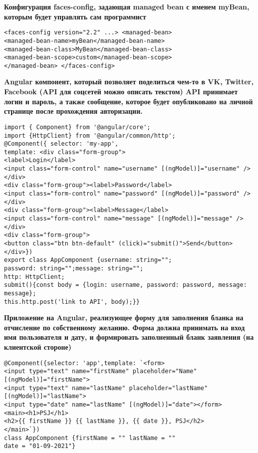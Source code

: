 \documentclass{article}
\begin{document}
\begin{minipage}[t]{0.3\textwidth}
    \textbf{Конфигурация faces-config, задающая managed bean с именем myBean, которым будет управлять сам программист}
    \begin{lstlisting}[frame=single, basicstyle=\tiny\ttfamily, breaklines=true, breakatwhitespace=true, postbreak=\mbox{\textcolor{red}{$\hookrightarrow$}\space}]
<faces-config version="2.2" ...> <managed-bean>
<managed-bean-name>myBean</managed-bean-name>
<managed-bean-class>MyBean</managed-bean-class>
<managed-bean-scope>custom</managed-bean-scope>
</managed-bean> </faces-config>
    \end{lstlisting}
\end{minipage}%
\hfill
\begin{minipage}[t]{0.3\textwidth}
    \textbf{Angular компонент, который позволяет поделиться чем-то в VK, Twitter, Facebook (API для соцсетей можно описать текстом)
    API принимает логин и пароль, а также сообщение, которое будет опубликовано на личной странице после прохождения авторизации.}
    \begin{lstlisting}[frame=single, basicstyle=\tiny\ttfamily, breaklines=true, breakatwhitespace=true, postbreak=\mbox{\textcolor{red}{$\hookrightarrow$}\space}]
import { Component} from '@angular/core';
import {HttpClient} from '@angular/common/http';
@Component({ selector: 'my-app',
template: <div class="form-group">
<label>Login</label>
<input class="form-control" name="username" [(ngModel)]="username" /> </div>
<div class="form-group"><label>Password</label>
<input class="form-control" name="password" [(ngModel)]="password" /></div>
<div class="form-group"><label>Message</label>
<input class="form-control" name="message" [(ngModel)]="message" /></div>
<div class="form-group">
<button class="btn btn-default" (click)="submit()">Send</button></div>})
export class AppComponent {username: string="";
password: string="";message: string="";
http: HttpClient;
submit(){const body = {login: username, password: password, message: message};
this.http.post('link to API', body);}}
    \end{lstlisting}
\end{minipage}%
\hfill
\begin{minipage}[t]{0.3\textwidth}
    \textbf{Приложение на Angular, реализующее форму для заполнения бланка на отчисление по собственному желанию. Форма должна принимать на вход имя пользователя и дату, и формировать заполненный бланк заявления (на клиентской стороне)}
    \begin{lstlisting}[frame=single, basicstyle=\tiny\ttfamily, breaklines=true, breakatwhitespace=true, postbreak=\mbox{\textcolor{red}{$\hookrightarrow$}\space}]
@Component({selector: 'app',template: `<form>
<input type="text" name="firstName" placeholder="Name" [(ngModel)]="firstName">
<input type="text" name="lastName" placeholder="lastName" [(ngModel)]="lastName">
<input type="date" name="lastName" [(ngModel)]="date"></form>
<main><h1>PSJ</h1>
<h2>{{ firstName }} {{ lastName }}, {{ date }}, PSJ</h2>
</main>`})
class AppComponent {firstName = "" lastName = ""
date = "01-09-2021"}
    \end{lstlisting}
\end{minipage}%
\\
\end{document}
